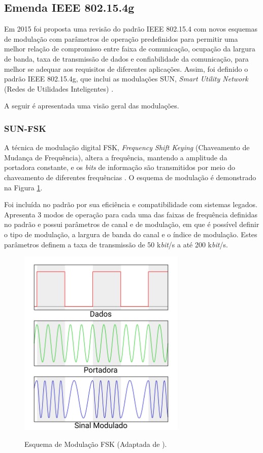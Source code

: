 \subsection{Emenda IEEE 802.15.4g}
Em 2015 foi proposta uma revisão do padrão IEEE 802.15.4 com novos esquemas de modulação com parâmetros de operação predefinidos para permitir uma melhor relação de compromisso entre faixa de comunicação, ocupação da largura de banda, taxa de transmissão de dados e confiabilidade da comunicação, para melhor se adequar aos requisitos de diferentes aplicações. Assim, foi definido o padrão IEEE 802.15.4g, que inclui as modulações SUN, \emph{Smart Utility Network} (Redes de Utilidades Inteligentes) \cite{tuset2020reliability}.

A seguir é apresentada uma visão geral das modulações.

\subsubsection{SUN-FSK}
A técnica de modulação digital FSK, \emph{Frequency Shift Keying} (Chaveamento de Mudança de Frequência), altera a frequência, mantendo a amplitude da portadora constante, e os \emph{bits} de informação são transmitidos por meio do chaveamento de diferentes frequências \cite{lathi2012}. O esquema de modulação é demonstrado na Figura \ref{fig:fsk}.

Foi incluída no padrão por sua eficiência e compatibilidade com sistemas legados. Apresenta 3 modos de operação para cada uma das faixas de frequência definidas no padrão e possui parâmetros de canal e de modulação, em que é possível definir o tipo de modulação, a largura de banda do canal e o índice de modulação. Estes parâmetros definem a taxa de transmissão de 50 k\emph{bit}/s a até 200 k\emph{bit}/s.

\begin{figure}[ht!]
      \begin{center}
            \includegraphics[width=8cm]{./sections/textual/chapters/images/Fsk.png}\\
            \caption{Esquema de Modulação FSK (Adaptada de \cite{figFSK}).}
            \label{fig:fsk}
      \end{center}
\end{figure}



